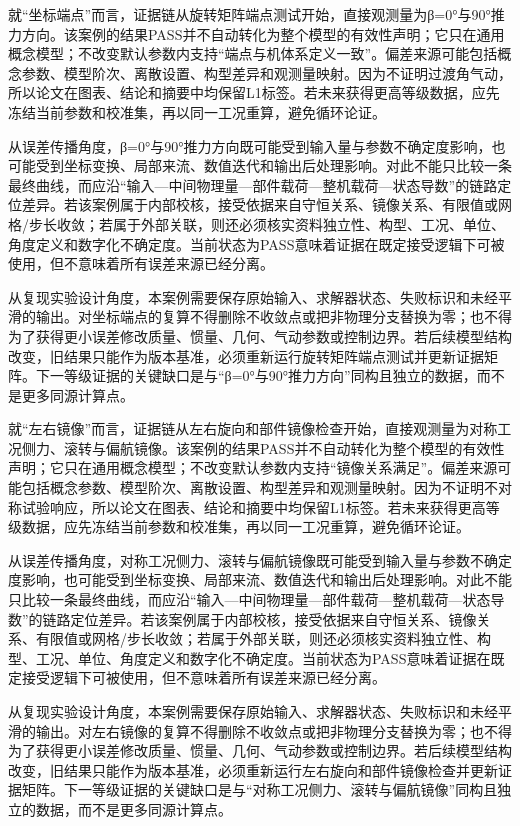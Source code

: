 \documentclass[UTF8,12pt,openany]{ctexbook}
\begin{document}
就“坐标端点”而言，证据链从旋转矩阵端点测试开始，直接观测量为β=0°与90°推力方向。该案例的结果PASS并不自动转化为整个模型的有效性声明；它只在通用概念模型；不改变默认参数内支持“端点与机体系定义一致”。偏差来源可能包括概念参数、模型阶次、离散设置、构型差异和观测量映射。因为不证明过渡角气动，所以论文在图表、结论和摘要中均保留L1标签。若未来获得更高等级数据，应先冻结当前参数和校准集，再以同一工况重算，避免循环论证。

从误差传播角度，β=0°与90°推力方向既可能受到输入量与参数不确定度影响，也可能受到坐标变换、局部来流、数值迭代和输出后处理影响。对此不能只比较一条最终曲线，而应沿“输入—中间物理量—部件载荷—整机载荷—状态导数”的链路定位差异。若该案例属于内部校核，接受依据来自守恒关系、镜像关系、有限值或网格/步长收敛；若属于外部关联，则还必须核实资料独立性、构型、工况、单位、角度定义和数字化不确定度。当前状态为PASS意味着证据在既定接受逻辑下可被使用，但不意味着所有误差来源已经分离。

从复现实验设计角度，本案例需要保存原始输入、求解器状态、失败标识和未经平滑的输出。对坐标端点的复算不得删除不收敛点或把非物理分支替换为零；也不得为了获得更小误差修改质量、惯量、几何、气动参数或控制边界。若后续模型结构改变，旧结果只能作为版本基准，必须重新运行旋转矩阵端点测试并更新证据矩阵。下一等级证据的关键缺口是与“β=0°与90°推力方向”同构且独立的数据，而不是更多同源计算点。

就“左右镜像”而言，证据链从左右旋向和部件镜像检查开始，直接观测量为对称工况侧力、滚转与偏航镜像。该案例的结果PASS并不自动转化为整个模型的有效性声明；它只在通用概念模型；不改变默认参数内支持“镜像关系满足”。偏差来源可能包括概念参数、模型阶次、离散设置、构型差异和观测量映射。因为不证明不对称试验响应，所以论文在图表、结论和摘要中均保留L1标签。若未来获得更高等级数据，应先冻结当前参数和校准集，再以同一工况重算，避免循环论证。

从误差传播角度，对称工况侧力、滚转与偏航镜像既可能受到输入量与参数不确定度影响，也可能受到坐标变换、局部来流、数值迭代和输出后处理影响。对此不能只比较一条最终曲线，而应沿“输入—中间物理量—部件载荷—整机载荷—状态导数”的链路定位差异。若该案例属于内部校核，接受依据来自守恒关系、镜像关系、有限值或网格/步长收敛；若属于外部关联，则还必须核实资料独立性、构型、工况、单位、角度定义和数字化不确定度。当前状态为PASS意味着证据在既定接受逻辑下可被使用，但不意味着所有误差来源已经分离。

从复现实验设计角度，本案例需要保存原始输入、求解器状态、失败标识和未经平滑的输出。对左右镜像的复算不得删除不收敛点或把非物理分支替换为零；也不得为了获得更小误差修改质量、惯量、几何、气动参数或控制边界。若后续模型结构改变，旧结果只能作为版本基准，必须重新运行左右旋向和部件镜像检查并更新证据矩阵。下一等级证据的关键缺口是与“对称工况侧力、滚转与偏航镜像”同构且独立的数据，而不是更多同源计算点。
\end{document}
